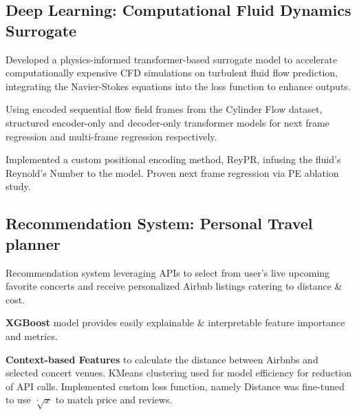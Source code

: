 

\subsection{{Deep Learning: Computational Fluid Dynamics Surrogate}}
\begin{zitemize}
\item Developed a physics-informed transformer-based surrogate model to accelerate computationally expensive CFD simulations on turbulent fluid flow prediction, integrating the Navier-Stokes equations into the loss function to enhance outputs.
\item Using encoded sequential flow field frames from the Cylinder Flow dataset, structured encoder-only and decoder-only transformer models for next frame regression and multi-frame regression respectively.
\item Implemented a custom positional encoding method, ReyPR, infusing the fluid’s Reynold’s Number to the model. Proven next frame regression via PE ablation study. 
\end{zitemize}


\subsection{{Recommendation System: Personal Travel planner}}
\begin{zitemize}
    \item Recommendation system leveraging APIs to select from user's live upcoming favorite concerts and receive personalized Airbnb listings catering to distance \& cost.  
    \item \textbf{XGBoost} model provides easily explainable \& interpretable feature importance and metrics. 
    \item \textbf{Context-based Features} to calculate the distance between Airbnbs and selected concert venues. KMeans clustering used for model efficiency for reduction of API calls. Implemented custom loss function, namely Distance was fine-tuned to use $\sqrt[^4]{x}$ to match price and reviews. 
\end{zitemize}




